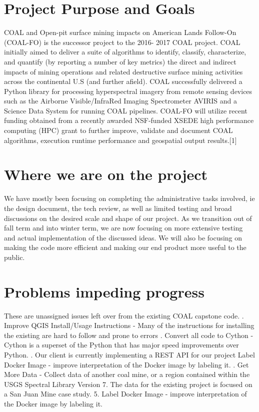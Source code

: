 \documentclass[onecolumn, draftclsnofoot,10pt, compsoc]{IEEEtran}
\begin{document}
\section{Project Purpose and Goals}

COAL and Open-pit surface mining impacts on American Lands Follow-On (COAL-FO) is the successor project to
the 2016- 2017 COAL project. COAL initially aimed to deliver a suite of algorithms to identify, classify, characterize,
and quantify (by reporting a number of key metrics) the direct and indirect impacts of mining operations and related
destructive surface mining activities across the continental U.S (and further afield). COAL successfully delivered a
Python library for processing hyperspectral imagery from remote sensing devices such as the Airborne Visible/InfraRed
Imaging Spectrometer AVIRIS and a Science Data System for running COAL pipelines. COAL-FO will utilize recent
funding obtained from a recently awarded NSF-funded XSEDE high performance computing (HPC) grant to further
improve, validate and document COAL algorithms, execution runtime performance and geospatial output results.[1]

\section{Where we are on the project}

We have mostly been focusing on completing the administrative tasks involved, ie the design document, the tech review, as well as limited testing and broad discussions on the desired scale and shape of our project. As we transition out of fall term and into winter term, we are now focusing on more extensive testing and actual implementation of the discussed ideas. We will also be focusing on making the code more efficient and making our end product more useful to the public.

\section{Problems impeding progress}
These are unassigned issues left over from the existing COAL capstone code. . Improve QGIS Install/Usage Instructions - Many of the instructions for installing the existing are hard to follow and prone to errors . Convert all code to Cython - Cython is a superset of the Python that has major speed improvements over Python. . Our client is currently implementing a REST API for our project
Label Docker Image - improve interpretation of the Docker image by labeling it. . Get More Data - Collect data of another coal mine, or a region contained within the USGS Spectral Library Version 7. The data for the existing project is focused on a San Juan Mine case study.
5. Label Docker Image - improve interpretation of the Docker image by labeling it.
\end{document}
